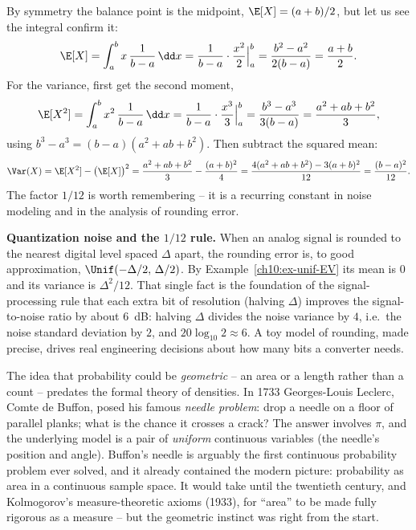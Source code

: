 \begin{example}
\label{ch10:ex-unif-EV}
By symmetry the balance point is the midpoint, $\E[X] = (a+b)/2$, but let us see the
integral confirm it:
\[
  \E[X] = \int_a^b x\,\frac{1}{b-a}\,\dd x
        = \frac{1}{b-a}\cdot \frac{x^2}{2}\Big|_a^b
        = \frac{b^2-a^2}{2(b-a)} = \frac{a+b}{2}.
\]
For the variance, first get the second moment,
\[
  \E[X^2] = \int_a^b x^2\,\frac{1}{b-a}\,\dd x
          = \frac{1}{b-a}\cdot \frac{x^3}{3}\Big|_a^b
          = \frac{b^3-a^3}{3(b-a)} = \frac{a^2+ab+b^2}{3},
\]
using $b^3-a^3 = (b-a)(a^2+ab+b^2)$. Then subtract the squared mean:
\[
  \Var(X) = \E[X^2] - \big(\E[X]\big)^2
          = \frac{a^2+ab+b^2}{3} - \frac{(a+b)^2}{4}
          = \frac{4(a^2+ab+b^2) - 3(a+b)^2}{12}
          = \frac{(b-a)^2}{12}.
\]
The factor $1/12$ is worth remembering -- it is a recurring constant in noise
modeling and in the analysis of rounding error.
\end{example}

\begin{applicationbox}
\textbf{Quantization noise and the $1/12$ rule.} When an analog signal is rounded
to the nearest digital level spaced $\Delta$ apart, the rounding error is, to good
approximation, $\Unif(-\Delta/2,\,\Delta/2)$. By Example~\ref{ch10:ex-unif-EV} its
mean is $0$ and its variance is $\Delta^2/12$. That single fact is the foundation of
the signal-processing rule that each extra bit of resolution (halving $\Delta$)
improves the signal-to-noise ratio by about $6$~dB: halving $\Delta$ divides the
noise variance by $4$, i.e.\ the noise standard deviation by $2$, and
$20\log_{10}2 \approx 6$. A toy model of rounding, made precise, drives real
engineering decisions about how many bits a converter needs.
\end{applicationbox}

\begin{historybox}
The idea that probability could be \emph{geometric} -- an area or a length rather
than a count -- predates the formal theory of densities. In 1733 Georges-Louis
Leclerc, Comte de Buffon, posed his famous \emph{needle problem}: drop a needle on a
floor of parallel planks; what is the chance it crosses a crack? The answer involves
$\pi$, and the underlying model is a pair of \emph{uniform} continuous variables (the
needle's position and angle). Buffon's needle is arguably the first continuous
probability problem ever solved, and it already contained the modern picture:
probability as area in a continuous sample space. It would take until the twentieth
century, and Kolmogorov's measure-theoretic axioms (1933), for ``area'' to be made
fully rigorous as a measure -- but the geometric instinct was right from the start.
\end{historybox}

